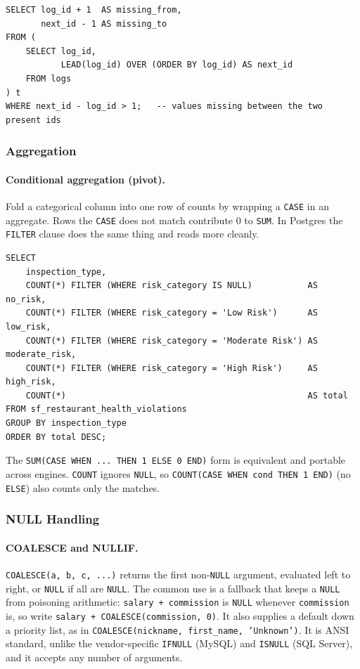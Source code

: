 \begin{lstlisting}[style=sql, caption={Gaps via LEAD}]
SELECT log_id + 1  AS missing_from,
       next_id - 1 AS missing_to
FROM (
    SELECT log_id,
           LEAD(log_id) OVER (ORDER BY log_id) AS next_id
    FROM logs
) t
WHERE next_id - log_id > 1;   -- values missing between the two present ids
\end{lstlisting}

\newpage

\subsubsection{Aggregation}

\paragraph{Conditional aggregation (pivot).} Fold a categorical column into one
row of counts by wrapping a \texttt{CASE} in an aggregate. Rows the
\texttt{CASE} does not match contribute 0 to \texttt{SUM}. In Postgres the
\texttt{FILTER} clause does the same thing and reads more cleanly.

\begin{lstlisting}[style=sql, caption={Pivot risk categories to columns}]
SELECT
    inspection_type,
    COUNT(*) FILTER (WHERE risk_category IS NULL)           AS no_risk,
    COUNT(*) FILTER (WHERE risk_category = 'Low Risk')      AS low_risk,
    COUNT(*) FILTER (WHERE risk_category = 'Moderate Risk') AS moderate_risk,
    COUNT(*) FILTER (WHERE risk_category = 'High Risk')     AS high_risk,
    COUNT(*)                                                AS total
FROM sf_restaurant_health_violations
GROUP BY inspection_type
ORDER BY total DESC;
\end{lstlisting}

The \texttt{SUM(CASE WHEN ... THEN 1 ELSE 0 END)} form is equivalent and
portable across engines. \texttt{COUNT} ignores \texttt{NULL}, so
\texttt{COUNT(CASE WHEN cond THEN 1 END)} (no \texttt{ELSE}) also counts only
the matches.

\subsubsection{NULL Handling}

\paragraph{COALESCE and NULLIF.} \texttt{COALESCE(a, b, c, ...)} returns the
first non-\texttt{NULL} argument, evaluated left to right, or \texttt{NULL} if
all are \texttt{NULL}. The common use is a fallback that keeps a \texttt{NULL}
from poisoning arithmetic: \texttt{salary + commission} is \texttt{NULL}
whenever \texttt{commission} is, so write \texttt{salary + COALESCE(commission, 0)}.
It also supplies a default down a priority list, as in
\texttt{COALESCE(nickname, first\_name, 'Unknown')}. It is ANSI standard,
unlike the vendor-specific \texttt{IFNULL} (MySQL) and \texttt{ISNULL}
(SQL Server), and it accepts any number of arguments.

